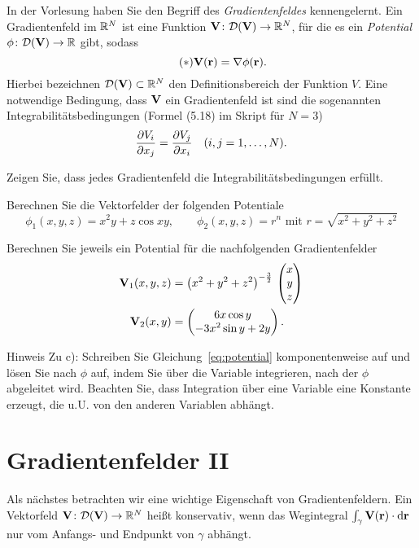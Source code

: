 \documentclass{scrartcl}
\newcommand{\DD}{\mathcal{D}}
\begin{document}
In der Vorlesung haben Sie den Begriff des \emph{Gradientenfeldes} kennengelernt.
Ein Gradientenfeld im $\RR^N$ ist eine Funktion $\mat V\colon \DD(\mat V) \to \RR^N$, für die es ein \emph{Potential} $\phi\colon \DD(\mat V) \to \RR$ gibt, sodass
\[
  \label{eq:potential}
  \tag{$\ast$}
  \mat V(\mat r) = \nabla \phi(\mat r).
\]
Hierbei bezeichnen $\DD(\mat V) \subset \RR^N$ den Definitionsbereich der Funktion $V$.
Eine notwendige Bedingung, dass $\mat V$ ein Gradientenfeld ist sind die sogenannten Integrabilitätsbedingungen (Formel (5.18) im Skript für $N = 3$)
\[
  \pderiv[V_i]{x_j} = \pderiv[V_j]{x_i} \quad (i,j=1,\ldots,N).
\]  
\begin{subex}
  \item{} Zeigen Sie, dass jedes Gradientenfeld die Integrabilitätsbedingungen erfüllt.
  \item{} Berechnen Sie die Vektorfelder der folgenden Potentiale
  \[
    \phi_1(x,y,z) = x^2 y + z \cos xy, \quad\quad \phi_2 (x,y,z) = r^n \mbox{ mit } r = \sqrt{x^2 + y^2 + z^2} 
  \]
  \item{} Berechnen Sie jeweils ein Potential für die nachfolgenden Gradientenfelder
  \begin{align*}
    \mat V_1(x,y,z) &= \left( x^2 + y^2 + z^2 \right)^{-\frac{3}{2}} \, \colvec{x \\ y \\ z} \\
    \mat V_2(x,y) &= \colvec{6x \cos y \\ -3x^2 \sin y + 2y}.
  \end{align*}
\end{subex}
\begin{remark}{Hinweis}
  Zu c): Schreiben Sie Gleichung~\eqref{eq:potential} komponentenweise auf und lösen Sie nach $\phi$ auf, indem Sie über die Variable integrieren, nach der $\phi$ abgeleitet wird.
  Beachten Sie, dass Integration über eine Variable eine Konstante erzeugt, die u.U. von den anderen Variablen abhängt.
\end{remark}

\section{Gradientenfelder II }
\label{sec:gradientenfelder2}

Als nächstes betrachten wir eine wichtige Eigenschaft von Gradientenfeldern.
Ein Vektorfeld $\mat V\colon \DD(\mat V) \to \RR^N$ heißt konservativ, wenn das Wegintegral $\int_\gamma \mat V(\mat r) \cdot \dd \mat r$ nur vom Anfangs- und Endpunkt von $\gamma$ abhängt.
\end{document}
